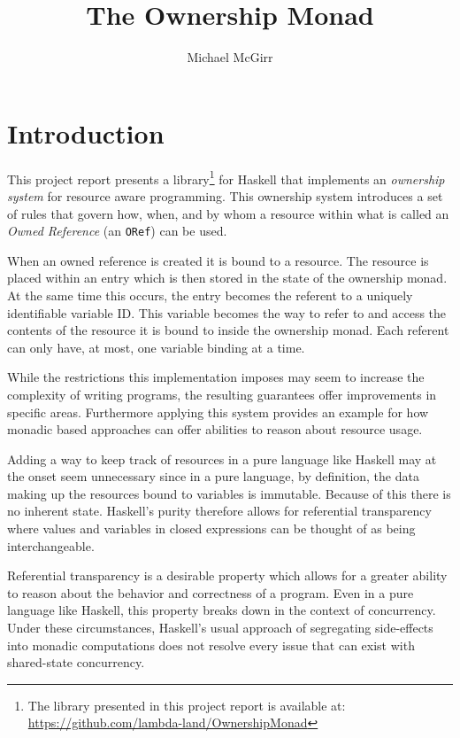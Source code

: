 \documentclass[onehalf,11pt]{beavtex}
\title{The Ownership Monad}
\author{Michael McGirr}
\begin{document}
\maketitle

\mainmatter

\chapter{Introduction}

This project report presents a
library\footnote{
  The library presented in this project report is available at:
  \href{https://github.com/lambda-land/OwnershipMonad}{https://github.com/lambda-land/OwnershipMonad}
}
for Haskell that implements an
\textit{ownership system} for resource aware programming. This ownership system
introduces a set of rules that govern how, when, and by whom a resource within
what is called an \textit{Owned Reference} (an \texttt{ORef}) can be used.

When an owned reference is created it is bound to a resource.
The resource is placed within an entry which is then stored in the state of the
ownership monad.
At the same time this occurs, the entry becomes the referent to a uniquely
identifiable variable ID.
This variable becomes the way to refer to and access the contents of the
resource it is bound to inside the ownership monad.
Each referent can only have, at most, one variable binding at a time.

While the restrictions this implementation imposes may seem to increase the
complexity of writing programs, the resulting guarantees offer improvements in
specific areas.
Furthermore applying this system provides an example for how monadic based
approaches can offer abilities to reason about resource usage.

Adding a way to keep track of resources in a pure language like Haskell may
at the onset seem unnecessary since in a pure language, by definition,
the data making up the resources bound to variables is immutable.
Because of this there is no inherent state.  Haskell's purity therefore allows
for referential transparency where values and variables in closed expressions
can be thought of as being interchangeable.

Referential transparency is a desirable property which allows for a greater
ability to reason about the behavior and correctness of a program.
Even in a pure language like Haskell, this property breaks down in the context
of concurrency.
Under these circumstances, Haskell's usual approach of segregating side-effects
into monadic computations does not resolve every issue that can exist with
shared-state concurrency.
\end{document}
